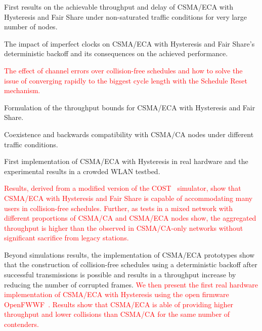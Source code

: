 \documentclass[a4paper,journal]{IEEEtran}
\begin{document}
\begin{itemize}
	\item First results on the achievable throughput and delay of CSMA/ECA with Hysteresis and Fair Share under non-saturated traffic conditions for very large number of nodes.
	\item The impact of imperfect clocks on CSMA/ECA with Hysteresis and Fair Share's deterministic backoff and its consequences on the achieved performance.
	\textcolor{red}{\item The effect of channel errors over collision-free schedules and how to solve the issue of converging rapidly to the biggest cycle length with the Schedule Reset mechanism.}
	\item Formulation of the throughput bounds for CSMA/ECA with Hysteresis and Fair Share.
	\item Coexistence and backwards compatibility with CSMA/CA nodes under different traffic conditions.
	\item First implementation of CSMA/ECA with Hysteresis in real hardware and the experimental results in a crowded WLAN testbed.
\end{itemize}

\textcolor{red}{Results, derived from a modified version of the COST~\cite{COST} simulator, show that CSMA/ECA with Hysteresis and Fair Share is capable of accommodating many users in collision-free schedules. Further, as tests in a mixed network with different proportions of CSMA/CA and CSMA/ECA nodes show, the aggregated throughput is higher than the observed in CSMA/CA-only networks without significant sacrifice from legacy stations.}

Beyond simulations results, the implementation of CSMA/ECA prototypes\cite{ECA-DEMO-INFOCOM14, sanabria2013prototyping, BECA-test,CF-MAC} show that the construction of collision-free schedules using a deterministic backoff after successful transmissions is possible and results in a throughput increase by reducing the number of corrupted frames. \textcolor{red}{We then present the first real hardware implementation of CSMA/ECA with Hysteresis using the open firmware OpenFWWF~\cite{OpenFWWF}. Results show that CSMA/ECA is able of providing higher throughput and lower collisions than CSMA/CA for the same number of contenders.}
\end{document}
